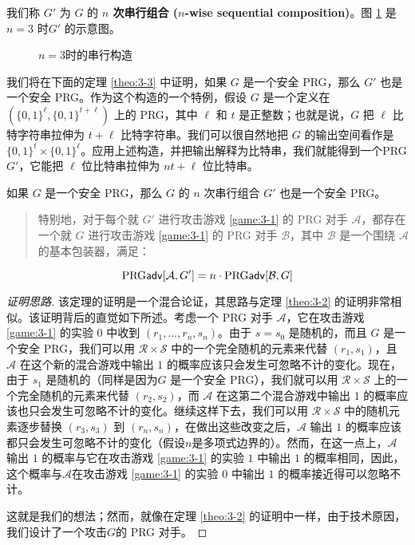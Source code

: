 \vspace*{5pt}

\noindent
我们称 $G'$ 为 $G$ 的 \textbf{$n$ 次串行组合 ($n$-wise sequential composition)}。图 \ref{fig:3-6} 是 $n=3$ 时$G'$ 的示意图。

\begin{figure}
	\centering
	
	\caption{$n=3$时的串行构造}
	\label{fig:3-6}
\end{figure}

我们将在下面的定理 \ref{theo:3-3} 中证明，如果 $G$ 是一个安全 PRG，那么 $G'$ 也是一个安全 PRG。作为这个构造的一个特例，假设 $G$ 是一个定义在 $(\{0,1\}^\ell,\{0,1\}^{t+\ell})$ 上的 PRG，其中 $\ell$ 和 $t$ 是正整数；也就是说，$G$ 把 $\ell$ 比特字符串拉伸为 $t+\ell$ 比特字符串。我们可以很自然地把 $G$ 的输出空间看作是 $\{0,1\}^t\times\{0,1\}^\ell$。应用上述构造，并把输出解释为比特串，我们就能得到一个PRG $G'$，它能把 $\ell$ 位比特串拉伸为 $nt+\ell$ 位比特串。

\begin{theorem}\label{theo:3-3}
如果 $G$ 是一个安全 PRG，那么 $G$ 的 $n$ 次串行组合 $G'$ 也是一个安全 PRG。
\begin{quote}
特别地，对于每个就 $G'$ 进行攻击游戏 \ref{game:3-1} 的 PRG 对手 $\mathcal A$，都存在一个就 $G$ 进行攻击游戏 \ref{game:3-1} 的 PRG 对手 $\mathcal B$，其中 $\mathcal B$ 是一个围绕 $\mathcal A$ 的基本包装器，满足：
\end{quote}
\[
{\rm PRG\mathsf{adv}}[\mathcal{A},G']=n\cdot{\rm PRG\mathsf{adv}}[\mathcal{B},G]
\]
\end{theorem}

\begin{proof}[证明思路]
该定理的证明是一个混合论证，其思路与定理 \ref{theo:3-2} 的证明非常相似。该证明背后的直觉如下所述。考虑一个 PRG 对手 $\mathcal A$，它在攻击游戏 \ref{game:3-1} 的实验 $0$ 中收到 $(r_1,\dots,r_n,s_n)$。由于 $s=s_0$ 是随机的，而且 $G$ 是一个安全 PRG，我们可以用 $\mathcal{R}\times\mathcal{S}$ 中的一个完全随机的元素来代替 $(r_1,s_1)$，且 $\mathcal A$ 在这个新的混合游戏中输出 $1$ 的概率应该只会发生可忽略不计的变化。现在，由于 $s_1$ 是随机的（同样是因为$G$ 是一个安全 PRG），我们就可以用 $\mathcal{R}\times\mathcal{S}$ 上的一个完全随机的元素来代替 $(r_2,s_2)$，而 $\mathcal A$ 在这第二个混合游戏中输出 $1$ 的概率应该也只会发生可忽略不计的变化。继续这样下去，我们可以用 $\mathcal{R}\times\mathcal{S}$ 中的随机元素逐步替换 $(r_3,s_3)$ 到 $(r_n,s_n)$，在做出这些改变之后，$\mathcal A$ 输出 $1$ 的概率应该都只会发生可忽略不计的变化（假设$n$是多项式边界的）。然而，在这一点上，$\mathcal A$ 输出 $1$ 的概率与它在攻击游戏 \ref{game:3-1} 的实验 $1$ 中输出 $1$ 的概率相同，因此，这个概率与$\mathcal A$在攻击游戏 \ref{game:3-1} 的实验 $0$ 中输出 $1$ 的概率接近得可以忽略不计。

这就是我们的想法；然而，就像在定理 \ref{theo:3-2} 的证明中一样，由于技术原因，我们设计了一个攻击$G$的 PRG 对手。
\end{proof}

